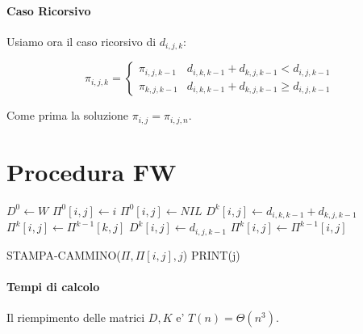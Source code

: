 \paragraph{Caso Ricorsivo}

Usiamo ora il caso ricorsivo di $d_{i,j,k}$:

\[
    \pi_{i,j,k} = 
    \begin{cases}
        \pi_{i,j,k-1} & d_{i,k,k-1} + d_{k,j,k-1} < d_{i,j,k-1} \\
        \pi_{k,j,k-1} & d_{i,k,k-1} + d_{k,j,k-1} \geq d_{i,j,k-1} 
    \end{cases}
\]

Come prima la soluzione $\pi_{i,j} = \pi_{i,j,n}$.

\section{Procedura FW}

\begin{algorithm}
    \begin{algorithmic}
        \State $D^0 \gets W$
                    \State $\Pi^0[i,j] \gets i$
                \Else
                    \State $\Pi^0[i,j] \gets NIL$
                \EndIf
            \EndFor
        \EndFor
                        \State $D^k[i,j] \gets d_{i,k,k-1} + d_{k,j,k-1}$
                        \State $\Pi^k[i,j] \gets \Pi^{k-1}[k,j]$
                    \Else
                        \State $D^k[i,j] \gets d_{i,j,k-1}$
                        \State $\Pi^k[i,j] \gets \Pi^{k-1}[i,j]$
                    \EndIf
                \EndFor
            \EndFor
        \EndFor
        \EndProcedure
    \end{algorithmic}
\end{algorithm}

\begin{algorithm}
    \begin{algorithmic}
                \State STAMPA-CAMMINO($\Pi, \Pi[i,j], j$)
                \State PRINT(j)
            \EndIf
        \EndProcedure
    \end{algorithmic}
\end{algorithm}

\paragraph{Tempi di calcolo}

Il riempimento delle matrici $D, K$ e' $T(n) = \Theta(n^3)$.


